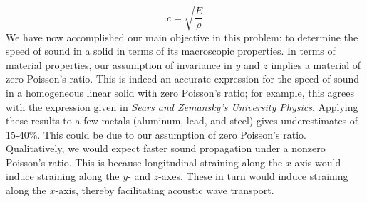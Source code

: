 \documentclass[letterpaper,12pt]{article}
\begin{document}
\begin{flushleft}
    $$\boxed{c = \sqrt{\frac{E}{\rho}}}$$
    We have now accomplished our main objective in this problem: to determine the speed of sound in a solid in terms of its macroscopic properties. In terms of material properties, our assumption of invariance in $y$ and $z$ implies a material of zero Poisson's ratio.\newline\newline
    This is indeed an accurate expression for the speed of sound in a homogeneous linear solid with zero Poisson's ratio; for example, this agrees with the expression given in \textit{Sears and Zemansky's University Physics}. Applying these results to a few metals (aluminum, lead, and steel) gives underestimates of 15-40\%. This could be due to our assumption of zero Poisson's ratio. Qualitatively, we would expect faster sound propagation under a nonzero Poisson's ratio. This is because longitudinal straining along the $x$-axis would induce straining along the $y$- and $z$-axes. These in turn would induce straining along the $x$-axis, thereby facilitating acoustic wave transport.


\end{flushleft}
\end{document}
